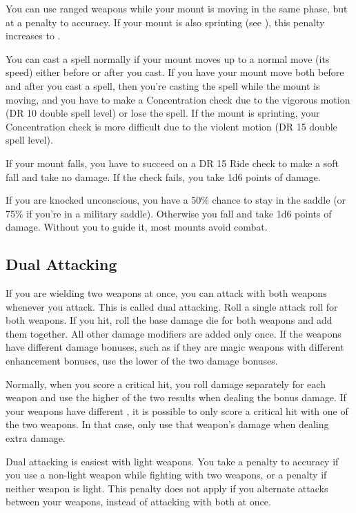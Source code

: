         You can use ranged weapons while your mount is moving in the same phase, but at a  penalty to accuracy.
        If your mount is also sprinting (see ), this penalty increases to .

         You can cast a spell normally if your mount moves up to a normal move (its speed) either before or after you cast. If you have your mount move both before and after you cast a spell, then you're casting the spell while the mount is moving, and you have to make a Concentration check due to the vigorous motion (DR 10 \add double spell level) or lose the spell. If the mount is sprinting, your Concentration check is more difficult due to the violent motion (DR 15 \add double spell level).

         If your mount falls, you have to succeed on a DR 15 Ride check to make a soft fall and take no damage. If the check fails, you take 1d6 points of damage.

         If you are knocked unconscious, you have a 50\% chance to stay in the saddle (or 75\% if you're in a military saddle). Otherwise you fall and take 1d6 points of damage. Without you to guide it, most mounts avoid combat.

    \subsection{Dual Attacking}\label{Dual Attacking}
        If you are wielding two weapons at once, you can attack with both weapons whenever you attack.
        This is called dual attacking.
        Roll a single attack roll for both weapons.
        If you hit, roll the base damage die for both weapons and add them together.
        All other damage modifiers are added only once.
        If the weapons have different damage bonuses, such as if they are magic weapons with different enhancement bonuses, use the lower of the two damage bonuses.

         Normally, when you score a critical hit, you roll damage separately for each weapon and use the higher of the two results when dealing the bonus damage. If your weapons have different , it is possible to only score a critical hit with one of the two weapons. In that case, only use that weapon's damage when dealing extra damage.

         Dual attacking is easiest with light weapons. You take a  penalty to accuracy if you use a non-light weapon while fighting with two weapons, or a  penalty if neither weapon is light. This penalty does not apply if you alternate attacks between your weapons, instead of attacking with both at once.

